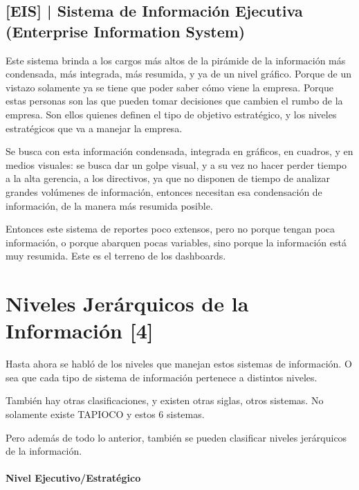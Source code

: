 \hypertarget{sistema-de-informaciuxf3n-ejecutiva}{%
\subsection{%
{[}EIS{]} |
Sistema de Información Ejecutiva
(Enterprise Information System)
}\label{sistema-de-informaciuxf3n-ejecutiva}}

Este sistema brinda a los cargos más altos de la pirámide de la
información más condensada, más integrada, más resumida, y ya de un
nivel gráfico. Porque de un vistazo solamente ya se tiene que poder
saber cómo viene la empresa. Porque estas personas son las que pueden
tomar decisiones que cambien el rumbo de la empresa. Son ellos quienes
definen el tipo de objetivo estratégico, y los niveles estratégicos que
va a manejar la empresa.

Se busca con esta información condensada, integrada en gráficos, en
cuadros, y en medios visuales: se busca dar un golpe visual, y a su vez
no hacer perder tiempo a la alta gerencia, a los directivos, ya que no
disponen de tiempo de analizar grandes volúmenes de información,
entonces necesitan esa condensación de información, de la manera más
resumida posible.

Entonces este sistema de reportes poco extensos, pero no porque tengan
poca información, o porque abarquen pocas variables, sino porque la
información está muy resumida. Este es el terreno de los dashboards.


\hypertarget{niveles-jeruxe1rquicos-de-la-informaciuxf3n}{%
\section{Niveles Jerárquicos de la
Información [4]}\label{niveles-jeruxe1rquicos-de-la-informaciuxf3n}}

Hasta ahora se habló de los niveles que manejan estos sistemas de
información. O sea que cada tipo de sistema de información pertenece a
distintos niveles.

También hay otras clasificaciones, y existen otras siglas, otros
sistemas. No solamente existe TAPIOCO y estos 6 sistemas.

Pero además de todo lo anterior, también se pueden clasificar niveles
jerárquicos de la información.

\paragraph{Nivel Ejecutivo/Estratégico}
